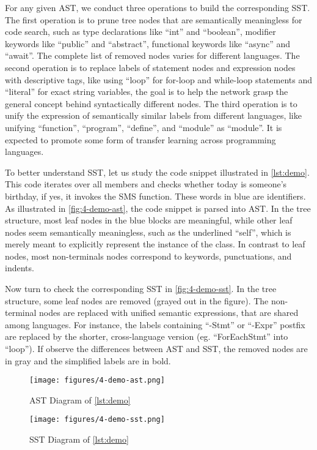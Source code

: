 \documentclass[conference]{IEEEtran}
\begin{document}
For any given AST, we conduct three operations to build the corresponding SST. The first operation is to prune tree nodes that are semantically meaningless for code search, such as type declarations like ``int'' and ``boolean'', modifier keywords like ``public'' and ``abstract'', functional keywords like ``async'' and ``await''. The complete list of removed nodes varies for different languages. The second operation is to replace labels of statement nodes and expression nodes with descriptive tags, like using ``loop'' for for-loop and while-loop statements and ``literal'' for exact string variables, the goal is to help the network grasp the general concept behind syntactically different nodes. The third operation is to unify the expression of semantically similar labels from different languages, like unifying ``function'', ``program'', ``define'', and ``module'' as ``module''. It is expected to promote some form of transfer learning across programming languages.


To better understand SST, let us study the code snippet illustrated in \autoref{lst:demo}. This code iterates over all members and checks whether today is someone's birthday, if yes, it invokes the SMS function. These words in blue are identifiers. As illustrated in \autoref{fig:4-demo-ast}, the code snippet is parsed into AST. In the tree structure, most leaf nodes in the blue blocks are meaningful, while other leaf nodes seem semantically meaningless, such as the underlined ``self'', which is merely meant to explicitly represent the instance of the class. In contrast to leaf nodes, most non-terminals nodes correspond to keywords, punctuations, and indents.

Now turn to check the corresponding SST in \autoref{fig:4-demo-sst}. In the tree structure, some leaf nodes are removed (grayed out in the figure).
The non-terminal nodes are replaced with unified semantic expressions, that are shared among languages. For instance, the labels containing ``-Stmt'' or ``-Expr'' postfix are replaced by the shorter, cross-language version (eg. ``ForEachStmt'' into ``loop''). If observe the differences between AST and SST, the removed nodes are in gray and the simplified labels are in bold.

\begin{figure}[!htb]
  \centering
  \texttt{[image: figures/4-demo-ast.png]}
  \caption{AST Diagram of \autoref{lst:demo}}
  \label{fig:4-demo-ast}
\end{figure}

\begin{figure}[!htb]
  \centering
  \texttt{[image: figures/4-demo-sst.png]}
  \caption{SST Diagram of \autoref{lst:demo}}
  \label{fig:4-demo-sst}
\end{figure}
\end{document}
